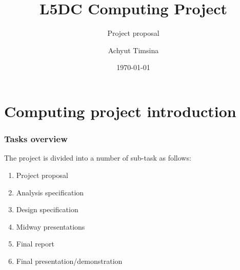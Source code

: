 \documentclass{beamer}
\title[CP]{L5DC Computing Project}
\subtitle{Project proposal}
\author{Achyut Timsina}
\date{\today}
\institute[Softwarica]{Softwarica college of IT \& E-Commerce\\
Kathmandu, Nepal\\
\url{achyut@gmail.com}
}
\begin{document}
\maketitle


\section{Computing project introduction} %
\label{sec:computing_project_introduction}


\begin{frame}[t]\frametitle{Tasks overview}
The project is divided into a number of sub-task as follows:
\begin{enumerate}
    \item Project proposal
    \item Analysis specification
    \item Design specification
    \item Midway presentations
    \item Final report
    \item Final presentation/demonstration
\end{enumerate}
\end{frame}
\end{document}
